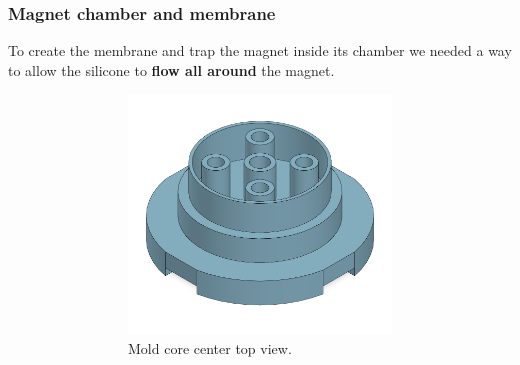 \begin{itemize}
\end{itemize}

\subsubsection{Magnet chamber and membrane}
To create the membrane and trap the magnet inside its chamber we needed a way to allow the silicone to \textbf{flow all around} the magnet.
\begin{figure}[H]
    \centering
    \begin{subfigure}[b]{0.8\linewidth}
        \begin{subfigure}[b]{0.475\textwidth}
            \centering
            \includegraphics[width=\linewidth]{Chapters/Chapter5/Flexible_Mat_Prototypes/Figures/mat_mold_core_center_top.PNG}
            \caption{Mold core center top view.}
            \label{fig: mat_mold_core_center_top}
        \end{subfigure}
        \hfill
        \begin{subfigure}[b]{0.475\textwidth}
            \centering

\end{subfigure}
\end{subfigure}
\end{figure}
